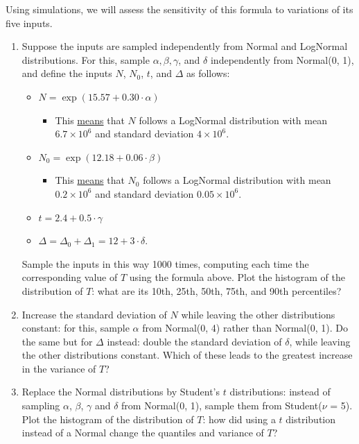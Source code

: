 \documentclass[11pt]{article}
\begin{document}
Using simulations, we will assess the sensitivity of this formula to variations of its five inputs.

\begin{enumerate}
	\item Suppose the inputs are sampled independently from Normal and LogNormal distributions. For this, sample $\alpha, \beta, \gamma$, and $\delta$ independently from Normal(0, 1), and define the inputs $N$, $N_0$, $t$, and $\Delta$ as follows:
	\begin{itemize}
		\item $N = \exp(15.57 + 0.30 \cdot \alpha)$ 
			\begin{itemize}
				\item This \href{https://www.johndcook.com/blog/2022/02/24/find-log-normal-parameters/}{means} that $N$ follows a LogNormal distribution with mean $6.7 \times 10^6$ and standard deviation $4 \times 10^6$.
			\end{itemize}
		\item $N_0 = \exp(12.18 + 0.06 \cdot \beta)$
			\begin{itemize}
				\item This \href{https://www.johndcook.com/blog/2022/02/24/find-log-normal-parameters/}{means} that $N_0$ follows a LogNormal distribution with mean $0.2 \times 10^6$ and standard deviation $0.05 \times 10^6$.
			\end{itemize}
		\item $t = 2.4 + 0.5 \cdot \gamma$
		\item $\Delta = \Delta_0 + \Delta_1 = 12 + 3 \cdot \delta$.
	\end{itemize}
	Sample the inputs in this way 1000 times, computing each time the corresponding value of $T$ using the formula above. Plot the histogram of the distribution of $T$: what are its 10th, 25th, 50th, 75th, and 90th percentiles?
	\item Increase the standard deviation of $N$ while leaving the other distributions constant: for this, sample $\alpha$ from Normal(0, 4) rather than Normal(0, 1). Do the same but for $\Delta$ instead: double the standard deviation of $\delta$, while leaving the other distributions constant. Which of these leads to the greatest increase in the variance of $T$?
	\item Replace the Normal distributions by Student's $t$ distributions: instead of sampling $\alpha$, $\beta$, $\gamma$ and $\delta$ from Normal(0, 1), sample them from Student($\nu$ = 5). Plot the histogram of the distribution of $T$: how did using a $t$ distribution instead of a Normal change the quantiles and variance of $T$? 

\end{enumerate}
\end{document}
